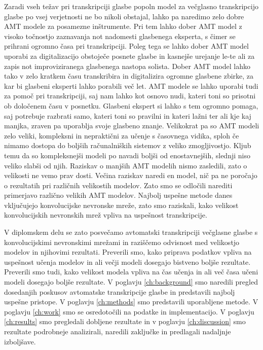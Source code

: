 \documentclass[a4paper, 12pt, openright]{book}
\begin{document}
Zaradi vseh težav pri transkripciji glasbe popoln model za večglasno transkripcijo glasbe po vsej verjetnosti ne bo nikoli obstajal, lahko pa naredimo zelo dobre AMT modele za posamezne inštrumente.
Pri tem lahko dober AMT model z visoko točnostjo zaznavanja not nadomesti glasbenega eksperta, s čimer se prihrani ogromno časa pri transkripciji.
Poleg tega se lahko dober AMT model uporabi za digitalizacijo obstoječe posnete glasbe in kasnejše urejanje le-te ali za zapis not improviziranega glasbenega nastopa solista.
Dober AMT model lahko tako v zelo kratkem času transkribira in digitalizira ogromne glasbene zbirke, za kar bi glasbeni eksperti lahko porabili več let.
AMT modele se lahko uporabi tudi za pomoč pri transkripciji, saj nam lahko kot osnovo nudi, kateri toni so prisotni ob določenem času v posnetku.
Glasbeni ekspert si lahko s tem ogromno pomaga, saj potrebuje razbrati samo, kateri toni so pravilni in kateri lažni ter ali kje kaj manjka, zraven pa uporablja svoje glasbeno znanje.
Velikokrat pa so AMT modeli zelo veliki, kompleksni in nepraktični za učenje s časovnega vidika, sploh če nimamo dostopa do boljših računalniških sistemov z veliko zmogljivostjo.
Kljub temu da so kompleksnejši modeli po navadi boljši od enostavnejših, slednji niso veliko slabši od njih.
Raziskav o manjših AMT modelih nismo zasledili, zato o velikosti ne vemo prav dosti. Večina raziskav naredi en model, nič pa ne poročajo o rezultatih pri različnih velikostih modelov.
Zato smo se odločili narediti primerjavo različno velikih AMT modelov.
Najbolj uspešne metode danes vključujejo konvolucijske nevronske mreže, zato smo raziskali, kako velikost konvolucijskih nevronskih mrež vpliva na uspešnost transkripcije.

V diplomskem delu se zato posvečamo avtomatski transkripciji večglasne glasbe s konvolucijskimi nevronskimi mrežami in raziščemo odvisnost med velikostjo modelov in njihovimi rezultati.
Preverili smo, kako priprava podatkov vpliva na uspešnost učenja modelov in ali večji modeli dosegajo bistveno boljše rezultate.
Preverili smo tudi, kako velikost modela vpliva na čas učenja in ali več časa učeni modeli dosegajo boljše rezultate.
V poglavju \ref{ch:background} smo naredili pregled dosedanjih poskusov avtomatske transkripcije glasbe in predstavili najbolj uspešne pristope.
V poglavju \ref{ch:methods} smo predstavili uporabljene metode.
V poglavju \ref{ch:work} smo se osredotočili na podatke in implementacijo.
V poglavju \ref{ch:results} smo pregledali dobljene rezultate in v poglavju \ref{ch:discussion} smo rezultate podrobneje analizirali, naredili zaključke in predlagali nadaljnje izboljšave.
\end{document}
